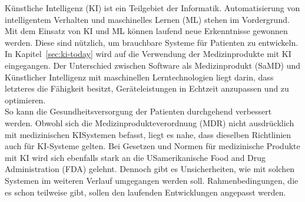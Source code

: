 Künstliche Intelligenz (KI) ist ein Teilgebiet der Informatik. Automatisierung von intelligentem Verhalten und maschinelles Lernen (ML) stehen im Vordergrund. Mit dem Einsatz von KI und ML können laufend neue Erkenntnisse gewonnen werden.
Diese sind nützlich, um brauchbare Systeme für Patienten zu entwickeln.\cite{AI_in_EU}\\
In Kapitel~\ref{sec:ki-today} wird auf die Verwendung der Medizinprodukte mit KI eingegangen.
Der Unterschied zwischen Software als Medizinprodukt (SaMD) und Künstlicher Intelligenz mit maschinellen Lerntechnologien liegt darin, dass letzteres die Fähigkeit besitzt, 
Geräteleistungen in Echtzeit anzupassen und zu optimieren.\cite{AI_in_EU}\\
So kann die Gesundheitsversorgung der Patienten durchgehend verbessert werden. 
Obwohl sich die Medizinprodukteverordnung (MDR) nicht ausdrücklich mit medizinischen KI\-Systemen befasst, 
liegt es nahe, dass dieselben Richtlinien auch für KI-Systeme gelten. 
Bei Gesetzen und Normen für medizinische Produkte mit KI wird sich ebenfalls stark an die US\-amerikanische Food and Drug Administration (FDA) gelehnt. 
Dennoch gibt es Unsicherheiten, wie mit solchen Systemen im weiteren Verlauf umgegangen werden soll. Rahmenbedingungen, die es schon teilweise gibt, sollen den laufenden Entwicklungen angepasst werden.